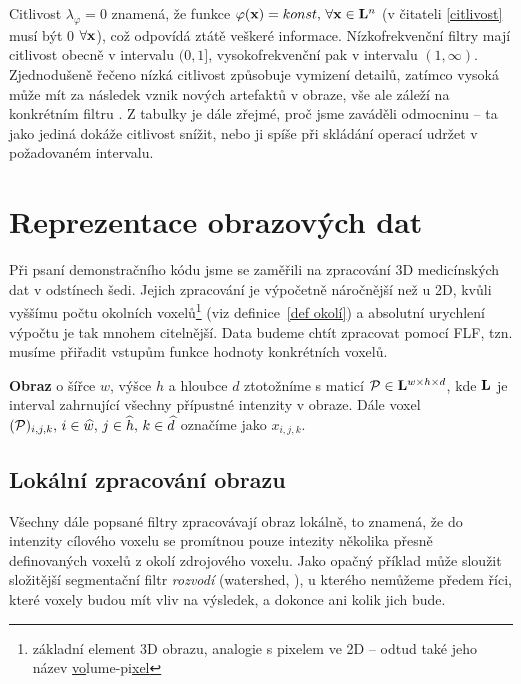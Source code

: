 Citlivost $\lambda_\varphi = 0$ znamená, že funkce $\varphi(\mathbf{x}) = konst, \, \forall \mathbf{x} \in \mathbf{L}^n$ (v čitateli \eqref{citlivost} musí být 0 $\forall \mathbf{x}$), což odpovídá ztátě veškeré informace. Nízkofrekvenční filtry mají citlivost obecně v intervalu $(0,1]$, vysokofrekvenční pak v intervalu $(1,\infty)$. Zjednodušeně řečeno nízká citlivost způsobuje vymizení detailů, zatímco vysoká může mít za následek vznik nových artefaktů v obraze, vše ale záleží na konkrétním filtru . Z tabulky je dále zřejmé, proč jsme zaváděli odmocninu -- ta jako jediná dokáže citlivost snížit, nebo ji spíše při skládání operací udržet v požadovaném intervalu. 


\section{Reprezentace obrazových dat}

Při psaní demonstračního kódu jsme se zaměřili na zpracování 3D medicínských dat v odstínech šedi. Jejich zpracování je výpočetně náročnější než u 2D, kvůli vyššímu počtu okolních voxelů\footnote{základní element 3D obrazu, analogie s pixelem ve 2D -- odtud také jeho název \bq \underline{vo}lume-pi\underline{xel}\eq} (viz definice~\ref{def okolí}) a absolutní urychlení výpočtu je tak mnohem citelnější. Data budeme chtít zpracovat pomocí FLF, tzn. musíme přiřadit vstupům funkce hodnoty konkrétních voxelů.

\begin{define}\label{def obraz}
  \textbf{Obraz} o šířce $w$, výšce $h$ a hloubce $d$ ztotožníme s maticí $\mathcal{P} \in \mathbf{L}^{w\times h\times d}$, kde $\mathbf{L}$ je interval zahrnující všechny přípustné intenzity v obraze. Dále voxel $(\mathcal{P})_{i,j,k}, \,i \in \widehat w, \,j \in \widehat h, \,k \in \widehat d$ označíme jako $x_{i,j,k}$.
\end{define}

    \subsection{Lokální zpracování obrazu}
    Všechny dále popsané filtry zpracovávají obraz lokálně, to znamená, že do intenzity cílového voxelu se promítnou pouze intezity několika přesně definovaných voxelů z okolí zdrojového voxelu. Jako opačný příklad může sloužit složitější segmentační filtr \emph{rozvodí} (watershed, \cite{Charypar}), u kterého nemůžeme předem říci, které voxely budou mít vliv na výsledek, a dokonce ani kolik jich bude.

